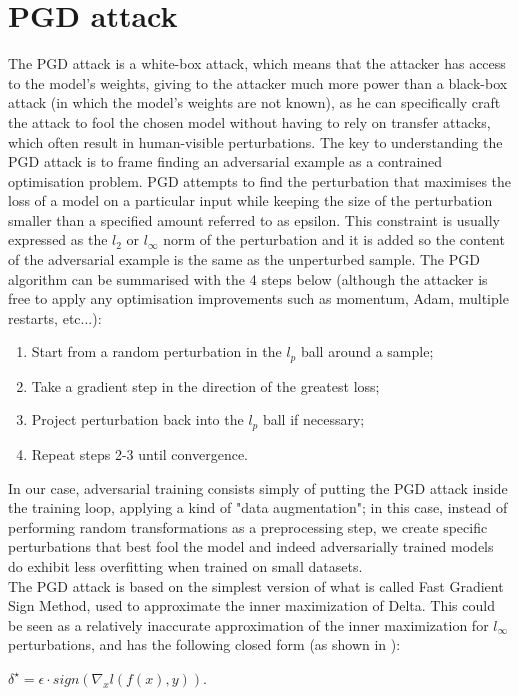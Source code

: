 \documentclass{article}
\begin{document}
\section{PGD attack}
The PGD attack is a white-box attack, which means that the attacker has access
to the model's weights, giving to the attacker much more power than a black-box
attack (in which the model's weights are not known), as he can specifically
craft the attack to fool the chosen model without having to rely on transfer
attacks, which often result in human-visible perturbations. The key to
understanding the PGD attack is to frame finding an adversarial example as a
contrained optimisation problem. PGD attempts to find the perturbation that
maximises the loss of a model on a particular input while keeping the size of
the perturbation smaller than a specified amount referred to as epsilon. This
constraint is usually expressed as the $l_2$ or $l_{\infty}$ norm of the
perturbation and it is added so the content of the adversarial example is the
same as the unperturbed sample. The PGD algorithm can be summarised with the 4
steps below (although the attacker is free to apply any optimisation
improvements such as momentum, Adam, multiple restarts, etc...):
\begin{enumerate}
	\item Start from a random perturbation in the $l_p$ ball around a sample;
	\item Take a gradient step in the direction of the greatest loss;
	\item Project perturbation back into the $l_p$ ball if necessary;
	\item Repeat steps 2-3 until convergence.
\end{enumerate}
In our case, adversarial training consists simply of putting the PGD attack
inside the training loop, applying a kind of "data augmentation"; in this case,
instead of performing random transformations as a preprocessing step, we create
specific perturbations that best fool the model and indeed adversarially trained
models do exhibit less overfitting when trained on small datasets.\\
The PGD attack is based on the simplest version of what is called Fast Gradient
Sign Method, used to approximate the inner maximization of Delta. This could be
seen as a relatively inaccurate approximation of the inner maximization for
$l_{\infty}$ perturbations, and has the following closed form (as shown in
\cite{GoodfellowEtAl2014}):
\begin{center}
	$\delta^{\star} = \epsilon \cdot sign(\nabla_{x}l(f(x), y))$.
\end{center}
\end{document}
